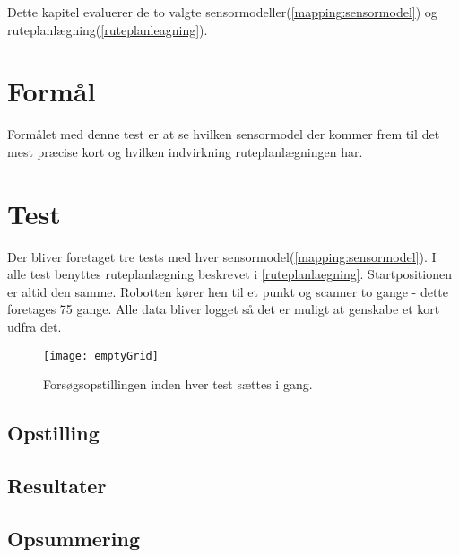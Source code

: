 Dette kapitel evaluerer de to valgte sensormodeller(\cref{mapping:sensormodel}) og ruteplanlægning(\cref{ruteplanleagning}).


\section{Formål}
Formålet med denne test er at se hvilken sensormodel der kommer frem til det mest præcise kort og hvilken indvirkning ruteplanlægningen har.

\section{Test}\label{evaluering:test_beskrivelse}
Der bliver foretaget tre tests med hver sensormodel(\cref{mapping:sensormodel}).
I alle test benyttes ruteplanlægning beskrevet i \cref{ruteplanlaegning}.
Startpositionen er altid den samme.
Robotten kører hen til et punkt og scanner to gange - dette foretages 75 gange.
Alle data bliver logget så det er muligt at genskabe et kort udfra det.

\begin{figure}
\texttt{[image: emptyGrid]}
\label{evaluering:emptyGrid}
\caption{Forsøgsopstillingen inden hver test sættes i gang.}
\end{figure}

\subsection{Opstilling}

\subsection{Resultater}

\subsection{Opsummering}
